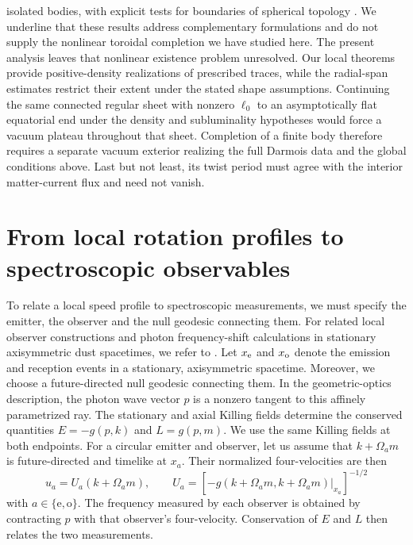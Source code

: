 \documentclass[amsmath,amsfonts,amssymb,aps,pra,superscriptaddress,10pt]{revtex4-2}
\numberwithin{equation}{section}
\theoremstyle{plain}
\theoremstyle{definition}
\theoremstyle{remark}
\theoremstyle{definition}
\newcommand{\ellzero}{\ell_0}
\begin{document}
isolated bodies, with explicit tests for boundaries of spherical topology \cite{MacCallumMarsVera2007PRD}. We underline that these results address complementary formulations and do not supply the nonlinear toroidal completion we have studied here. The present analysis leaves that nonlinear existence problem unresolved. Our local theorems provide positive-density realizations of prescribed traces, while the radial-span estimates restrict their extent under the stated shape assumptions. Continuing the same connected regular sheet with nonzero $\ellzero$ to an asymptotically flat equatorial end under the density and subluminality hypotheses would force a vacuum plateau throughout that sheet. Completion of a finite body therefore requires a separate vacuum exterior realizing the full Darmois data and the global conditions above. Last but not least, its twist period must agree with the interior matter-current flux and need not vanish.

\section{From local rotation profiles to spectroscopic observables}\label{observscope}

To relate a local speed profile to spectroscopic measurements, we must specify the emitter, the observer and the null geodesic connecting them. For related local observer constructions and photon frequency-shift calculations in stationary axisymmetric dust spacetimes, we refer to \cite{FontanaCacciatoriPeron2026arXiv}. Let $x_{\rm{e}}$ and $x_{\rm{o}}$ denote the emission and reception events in a stationary, axisymmetric spacetime. Moreover, we choose a future-directed null geodesic connecting them. In the geometric-optics description, the photon wave vector $p$ is a nonzero tangent to this affinely parametrized ray. The stationary and axial Killing fields determine the conserved quantities $E=-g(p,k)$ and $L=g(p,m)$. We use the same Killing fields at both endpoints. For a circular emitter and observer, let us assume that $k+\Omega_a m$ is future-directed and timelike at $x_a$. Their normalized four-velocities are then
\begin{equation}
u_a=U_a(k+\Omega_a m),\qquad
U_a=\left[-g(k+\Omega_a m,k+\Omega_a m)|_{x_a}\right]^{-1/2}
\end{equation}
with $a\in\{{\mathrm{e},\mathrm{o}}\}$. The frequency measured by each observer is obtained by contracting $p$ with that observer's four-velocity. Conservation of $E$ and $L$ then relates the two measurements.
\end{document}
